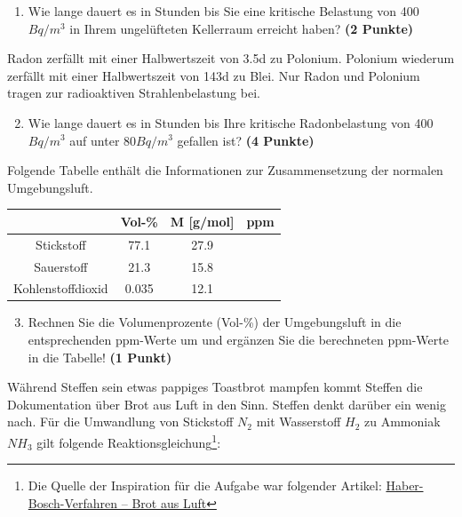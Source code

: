 \documentclass[a4paper, 9pt]{scrartcl}\usepackage[]{graphicx}\usepackage[]{xcolor}
\begin{document}
\vspace{-0.75cm}

\begin{enumerate}
\item Wie lange dauert es in Stunden bis Sie eine kritische Belastung von 400$Bq/m^3$ in Ihrem ungelüfteten Kellerraum erreicht haben? \textbf{(2 Punkte)}
\end{enumerate}

Radon zerfällt mit einer Halbwertszeit von 3.5d zu Polonium. Polonium wiederum zerfällt mit einer Halbwertszeit von 143d zu Blei. Nur Radon und Polonium tragen zur radioaktiven Strahlenbelastung bei.

\begin{enumerate}
  \setcounter{enumi}{1}
\item Wie lange dauert es in Stunden bis Ihre kritische Radonbelastung von
  400$Bq/m^3$ auf unter 80$Bq/m^3$ gefallen ist?
  \textbf{(4 Punkte)}
\end{enumerate}

Folgende Tabelle enthält die Informationen zur Zusammensetzung der normalen Umgebungsluft.

\begin{center}
  \begin{tabular}{ c|c|c|c }
     & Vol-\% & M [g/mol] & ppm \\
    \hline
    Stickstoff & 77.1 & 27.9 &
                                                    \phantom{1000000000000}\strut\\
        \hline
    Sauerstoff & 21.3 & 15.8 &
                                                    \phantom{10000000}\strut\\
        \hline
    Kohlenstoffdioxid & 0.035 & 12.1 & \phantom{10000000}\strut\\     
     \hline
\end{tabular}
\end{center}

\begin{enumerate}
   \setcounter{enumi}{2}
\item Rechnen Sie die Volumenprozente (Vol-\%) der Umgebungsluft in die entsprechenden ppm-Werte um und ergänzen Sie die berechneten ppm-Werte in die Tabelle!  \textbf{(1 Punkt)}
\end{enumerate}

Während Steffen sein etwas pappiges Toastbrot mampfen kommt Steffen die Dokumentation über Brot aus Luft in den Sinn. Steffen denkt darüber ein wenig nach. Für die Umwandlung von Stickstoff $N_2$ mit Wasserstoff $H_2$ zu Ammoniak $NH_3$ gilt folgende Reaktionsgleichung\footnote{Die Quelle der Inspiration für die Aufgabe war folgender Artikel: \href{https://www.gdch.de/netzwerk-strukturen/fachstrukturen/ag-chemie-und-gesellschaft/projekte-und-veranstaltungen/cartoons/haber-bosch-verfahren-brot-aus-luft.html}{Haber-Bosch-Verfahren – Brot aus Luft}}:
\end{document}
